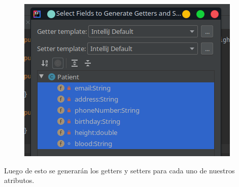 \documentclass{article}
\begin{document}
\begin{figure}[h!]
  \centering
  \includegraphics[scale=0.75]{./Pictures/035_generate.png}
\end{figure}

Luego de esto se generarán los getters y setters para cada uno de nuestros
atributos.\\
\end{document}
